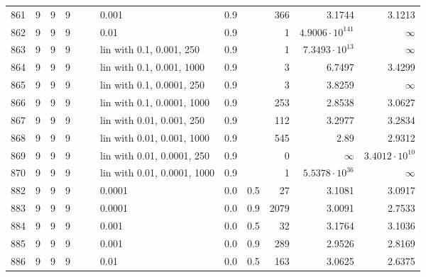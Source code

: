 \begin{longtable}{lrrrrrlrrrrr}
 861 &       9 & 9 & 9 &   &   &                       0.001 &  0.9 &        &     366 &                 3.1744 &                 3.1213 \\
 862 &       9 & 9 & 9 &   &   &                        0.01 &  0.9 &        &       1 & $4.9006\cdot 10^{141}$ &               $\infty$ \\
 863 &       9 & 9 & 9 &   &   &    lin with 0.1, 0.001, 250 &  0.9 &        &       1 &  $7.3493\cdot 10^{13}$ &               $\infty$ \\
 864 &       9 & 9 & 9 &   &   &   lin with 0.1, 0.001, 1000 &  0.9 &        &       3 &                 6.7497 &                 3.4299 \\
 865 &       9 & 9 & 9 &   &   &   lin with 0.1, 0.0001, 250 &  0.9 &        &       3 &                 3.8259 &               $\infty$ \\
 866 &       9 & 9 & 9 &   &   &  lin with 0.1, 0.0001, 1000 &  0.9 &        &     253 &                 2.8538 &                 3.0627 \\
 867 &       9 & 9 & 9 &   &   &   lin with 0.01, 0.001, 250 &  0.9 &        &     112 &                 3.2977 &                 3.2834 \\
 868 &       9 & 9 & 9 &   &   &  lin with 0.01, 0.001, 1000 &  0.9 &        &     545 &                   2.89 &                 2.9312 \\
 869 &       9 & 9 & 9 &   &   &  lin with 0.01, 0.0001, 250 &  0.9 &        &       0 &               $\infty$ &  $3.4012\cdot 10^{10}$ \\
 870 &       9 & 9 & 9 &   &   & lin with 0.01, 0.0001, 1000 &  0.9 &        &       1 &  $5.5378\cdot 10^{36}$ &               $\infty$ \\
 882 &       9 & 9 & 9 &   &   &                      0.0001 &  0.0 &    0.5 &      27 &                 3.1081 &                 3.0917 \\
 883 &       9 & 9 & 9 &   &   &                      0.0001 &  0.0 &    0.9 &    2079 &                 3.0091 &                 2.7533 \\
 884 &       9 & 9 & 9 &   &   &                       0.001 &  0.0 &    0.5 &      32 &                 3.1764 &                 3.1036 \\
 885 &       9 & 9 & 9 &   &   &                       0.001 &  0.0 &    0.9 &     289 &                 2.9526 &                 2.8169 \\
 886 &       9 & 9 & 9 &   &   &                        0.01 &  0.0 &    0.5 &     163 &                 3.0625 &                 2.6375 \\

\end{longtable}
